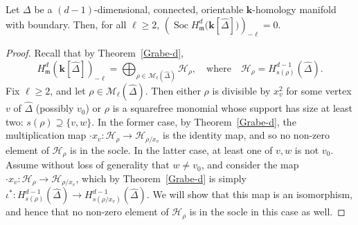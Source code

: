 \documentclass[ALCO,ThmDefs,Unicode,epreuves]{cedram}
\DeclareMathOperator{\Soc}{Soc}
\newcommand{\complet}[1]{\hat{#1}}
\newcommand{\field}{\mathbf{k}}
\newcommand{\M}{{\mathcal M}}
\newcommand{\HH}{{\mathcal H}}
\newcommand{\mideal}{\ensuremath{\mathfrak{m}}}
\begin{document}
\begin{lemma} \label{vanishing-socle}
Let $\Delta$ be a $(d-1)$-dimensional, connected, orientable $\field$-homology manifold with boundary. Then, for all $\ell\geq 2$,
$\left(\Soc H^{d}_\mideal\big(\field[\complet{\Delta}]\big)\right)_{-\ell}=0.$
\end{lemma}
\begin{proof} Recall that by Theorem~\ref{Grabe-d},
\begin{equation} \label{eq:H_d}
H^d_{\mideal}(\field[\complet{\Delta}])_{-\ell}=\bigoplus_{\rho\in\M_\ell(\complet{\Delta})} \HH_{\rho}, \quad \mbox{where} \quad \HH_{\rho}=H^{d-1}_{s(\rho)}(\complet{\Delta}).
\end{equation}
Fix $\ell\geq 2$, and let $\rho\in\M_\ell(\complet{\Delta})$. Then either $\rho$ is divisible by $x_v^2$ for some vertex $v$ of $\complet{\Delta}$ (possibly $v_0$) or $\rho$ is a squarefree monomial whose support has size at least two: $s(\rho)\supseteq\{v, w\}$. In the former case, by Theorem~\ref{Grabe-d}, the multiplication map $\cdot x_v: \HH_{\rho} \to \HH_{\rho/x_v}$ is the identity map, and so no non-zero element of $\HH_{\rho}$ is in the socle. In the latter case, at least one of $v,w$ is not $v_0$. Assume without loss of generality that $w\neq v_0$, and consider the map $\cdot x_v: \HH_{\rho} \to \HH_{\rho/x_v}$, which by Theorem~\ref{Grabe-d} is simply $\iota^\ast: H^{d-1}_{s(\rho)}(\complet{\Delta}) \to H^{d-1}_{s(\rho/x_v)}(\complet{\Delta})$. We will show that this map is an isomorphism, and hence that no non-zero element of $\HH_{\rho}$ is in the socle in this case as well.


\end{proof}
\end{document}
